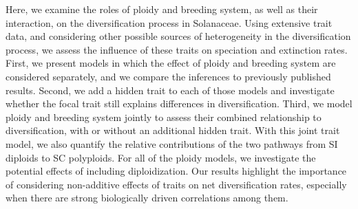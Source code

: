 Here, we examine the roles of ploidy and breeding system, as well as their interaction, on the diversification process in Solanaceae.
Using extensive trait data, and considering other possible sources of heterogeneity in the diversification process, we assess the influence of these traits on speciation and extinction rates.
First, we present models in which the effect of ploidy and breeding system are considered separately, and we compare the inferences to previously published results. 
Second, we add a hidden trait to each of those models and investigate whether the focal trait still explains differences in diversification.
Third, we model ploidy and breeding system jointly to assess their combined relationship to diversification, with or without an additional hidden trait.
With this joint trait model, we also quantify the relative contributions of the two pathways from SI diploids to SC polyploids.
For all of the ploidy models, we investigate the potential effects of including diploidization.
Our results highlight the importance of considering non-additive effects of traits on net diversification rates, especially when there are strong biologically driven correlations among them.

